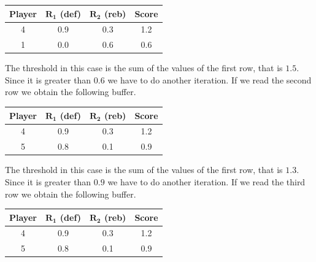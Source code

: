 \begin{enumerate}
        \begin{table}[H]
            \centering
            \begin{tabular}{c|cc|c}
            \hline
            \textbf{Player} & \textbf{$\boldsymbol{R_1}$ (def)} & \textbf{$\boldsymbol{R_2}$ (reb)} & \textbf{Score} \\ \hline
            4               & 0.9                               & 0.3                               & 1.2            \\
            1               & 0.0                               & 0.6                               & 0.6            \\ \hline
            \end{tabular}
        \end{table}
        The threshold in this case is the sum of the values of the first row, that is $1.5$.
        Since it is greater than $0.6$ we have to do another iteration. 
        If we read the second row we obtain the following buffer. 
        \begin{table}[H]
            \centering
            \begin{tabular}{c|cc|c}
            \hline
            \textbf{Player} & \textbf{$\boldsymbol{R_1}$ (def)} & \textbf{$\boldsymbol{R_2}$ (reb)} & \textbf{Score} \\ \hline
            4               & 0.9                               & 0.3                               & 1.2            \\
            5               & 0.8                               & 0.1                               & 0.9            \\ \hline
            \end{tabular}
        \end{table}
        The threshold in this case is the sum of the values of the first row, that is $1.3$. 
        Since it is greater than $0.9$ we have to do another iteration. 
        If we read the third row we obtain the following buffer. 
        \begin{table}[H]
            \centering
            \begin{tabular}{c|cc|c}
            \hline
            \textbf{Player} & \textbf{$\boldsymbol{R_1}$ (def)} & \textbf{$\boldsymbol{R_2}$ (reb)} & \textbf{Score} \\ \hline
            4               & 0.9                               & 0.3                               & 1.2            \\
            5               & 0.8                               & 0.1                               & 0.9            \\ \hline

\end{tabular}
\end{table}
\end{enumerate}
